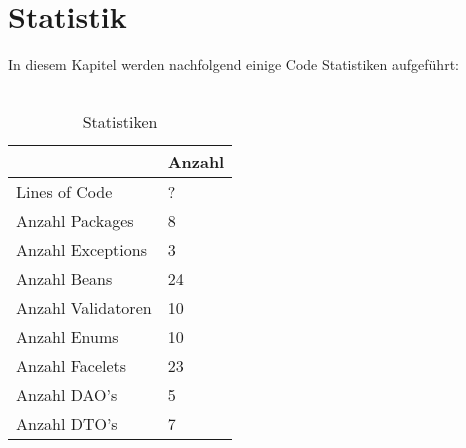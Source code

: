 \chapter{Statistik}

In diesem Kapitel werden nachfolgend einige Code Statistiken aufgeführt:\ \\
\ \\
\begin{table}[h]
	\begin{center}
		\begin{tabular}{|p{6cm}|p{6cm}|}
			\hline \textbf{} & \textbf{Anzahl}  \\ 
			\hline Lines of Code &  ? \\ 
			\hline Anzahl Packages & 8  \\ 
			\hline Anzahl Exceptions & 3 \\ 
			\hline Anzahl Beans &  24 \\ 
			\hline Anzahl Validatoren & 10\\ 
			\hline Anzahl Enums & 10\\
			\hline Anzahl Facelets & 23\\
			\hline Anzahl DAO's & 5\\
			\hline Anzahl DTO's & 7\\
			\hline 
		\end{tabular} 
		\caption{Statistiken}
		\label{fig:Statistiken}
	\end{center}
\end{table}